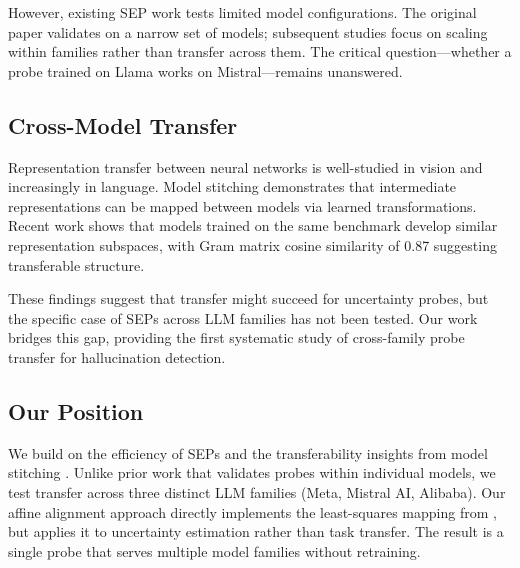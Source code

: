 However, existing SEP work tests limited model configurations. The original paper \citep{kossen2024semantic} validates on a narrow set of models; subsequent studies focus on scaling within families rather than transfer across them. The critical question---whether a probe trained on Llama works on Mistral---remains unanswered.

\subsection{Cross-Model Transfer}

Representation transfer between neural networks is well-studied in vision \citep{yosinski2014transferable} and increasingly in language. Model stitching \citep{lenc2015understanding,chen2025model} demonstrates that intermediate representations can be mapped between models via learned transformations. Recent work \citep{kim2026same} shows that models trained on the same benchmark develop similar representation subspaces, with Gram matrix cosine similarity of 0.87 suggesting transferable structure.

These findings suggest that transfer might succeed for uncertainty probes, but the specific case of SEPs across LLM families has not been tested. Our work bridges this gap, providing the first systematic study of cross-family probe transfer for hallucination detection.

\subsection{Our Position}

We build on the efficiency of SEPs \citep{kossen2024semantic} and the transferability insights from model stitching \citep{chen2025model}. Unlike prior work that validates probes within individual models, we test transfer across three distinct LLM families (Meta, Mistral AI, Alibaba). Our affine alignment approach directly implements the least-squares mapping from \citet{chen2025model}, but applies it to uncertainty estimation rather than task transfer. The result is a single probe that serves multiple model families without retraining.

